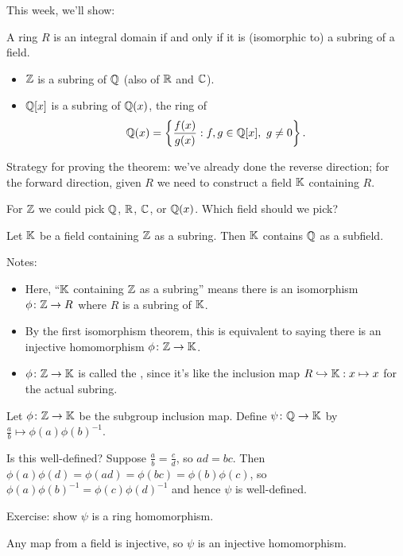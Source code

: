 \documentclass[12pt,letterpaper]{report}
\begin{document}
This week, we'll show:

\begin{thm}{}{}
  A ring $R$ is an integral domain if and only if it is (isomorphic to) a subring of a field.
\end{thm}

\begin{ex}
  \begin{itemize}
    \item $\mathbb{Z}$ is a subring of $\mathbb{Q}$ (also of $\mathbb{R}$ and $\mathbb{C}$).
    \item $\mathbb{Q}[x]$ is a subring of $\mathbb{Q}(x)$, the ring of 
      \[ \mathbb{Q}(x) = \left\{ \frac{f(x)}{g(x)} : f, g \in \mathbb{Q}[x], \ g \neq 0 \right\}. \]
  \end{itemize}
\end{ex}

Strategy for proving the theorem: we've already done the reverse direction; for the forward
direction, given $R$ we need to construct a field $\mathbb{K}$ containing $R$.

For $\mathbb{Z}$ we could pick $\mathbb{Q}$, $\mathbb{R}$, $\mathbb{C}$, or $\mathbb{Q}(x)$.
Which field should we pick?

\begin{lem}{}{}
  Let $\mathbb{K}$ be a field containing $\mathbb{Z}$ as a subring.
  Then $\mathbb{K}$ contains $\mathbb{Q}$ as a subfield.
\end{lem}

Notes:
\begin{itemize}
  \item Here, ``$\mathbb{K}$ containing $\mathbb{Z}$ as a subring'' means there is an isomorphism
    $\phi \colon \mathbb{Z} \to R$ where $R$ is a subring of $\mathbb{K}$.
  \item By the first isomorphism theorem, this is equivalent to saying there is an injective
    homomorphism $\phi \colon \mathbb{Z} \to \mathbb{K}$.
  \item $\phi \colon \mathbb{Z} \to \mathbb{K}$ is called the , since it's
    like the inclusion map $R \hookrightarrow \mathbb{K} : x \mapsto x$ for the actual subring.
\end{itemize}

\begin{thmproof}
  Let $\phi \colon \mathbb{Z} \to \mathbb{K}$ be the subgroup inclusion map.
  Define $\psi \colon \mathbb{Q} \to \mathbb{K}$ by $\frac{a}{b} \mapsto \phi(a)\phi(b)^{-1}$.

  Is this well-defined?
  Suppose $\frac{a}{b} = \frac{c}{d}$, so $ad = bc$.
  Then $\phi(a)\phi(d) = \phi(ad) = \phi(bc) = \phi(b)\phi(c)$, so
  $\phi(a)\phi(b)^{-1} = \phi(c)\phi(d)^{-1}$ and hence $\psi$ is well-defined.

  Exercise: show $\psi$ is a ring homomorphism.

  Any map from a field is injective, so $\psi$ is an injective homomorphism.
\end{thmproof}
\end{document}
